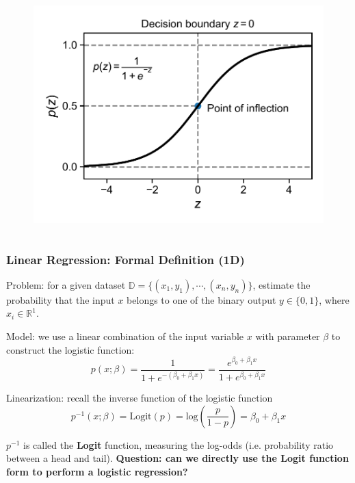 \documentclass[10pt,aspectratio=169]{beamer}
\begin{document}
\begin{frame}
\begin{columns}[T]
\begin{column}{0.5\textwidth}
        \begin{figure}[t]%
          \hspace*{-0.1\textwidth}%
          \includegraphics[width=1.2\textwidth]{scripts/logistic_fun_alone.pdf}
        \end{figure}
        
      \end{column}
      
    \end{columns}
  \end{frame}

  \begin{frame}
    \frametitle{Linear Regression: Formal Definition (1D)}
    Problem: for a given dataset
    $\mathbb{D} = \{(x_{1}, y_{1}), \cdots, (x_{n}, y_{n})\}$,
    estimate the probability that the input $x$ belongs to one of the
    binary output $y \in \{0, 1\}$, where $x_{i} \in \mathbb{R}^{1}$.

    \vfill Model: we use a linear combination of the input variable
    $x$ with parameter $\beta$ to construct the logistic function:
    \begin{equation*}
      p(x; \beta) = \dfrac{1}{1 + e^{-(\beta_{0} + \beta_{1} x)}} = \dfrac{e^{\beta_{0} + \beta_{1} x}}{1 + e^{\beta_{0} + \beta_{1} x}}
    \end{equation*}

    \vfill Linearization: recall the inverse function of the logistic
    function
    \begin{equation*}
      p^{-1}(x; \beta) = \mathrm{Logit}(p) = \mathrm{log} (\dfrac{p}{1 - p} ) = \beta_{0} + \beta_{1} x
    \end{equation*}

    $p^{-1}$ is called the \textbf{Logit} function, measuring the
    log-odds (i.e. probability ratio between a head and tail). %
    \vfill%
    \textbf{Question: can we directly use the Logit function form to
      perform a logistic regression?}
  
  \end{frame}
\end{document}

